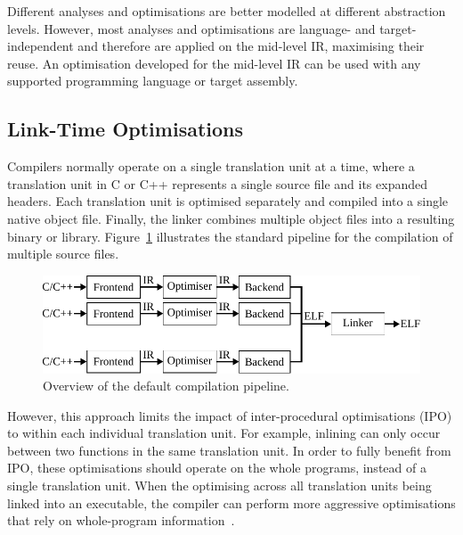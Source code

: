 Different analyses and optimisations are better modelled at different abstraction levels.
However, most analyses and optimisations are language- and target-independent and therefore are applied on the mid-level IR, maximising their reuse.
An optimisation developed for the mid-level IR can be used with any supported programming language or target assembly.

\subsection{Link-Time Optimisations}

Compilers normally operate on a single translation unit at a time, where a translation unit in C or C++ represents a single source file and its expanded headers.
Each translation unit is optimised separately and compiled into a single native object file.
Finally, the linker combines multiple object files into a resulting binary or library.
Figure~\ref{fig:full-pipeline} illustrates the standard pipeline for the compilation of multiple source files.

\begin{figure}[h]
  \centering
  \includegraphics[scale=0.85]{src/background/figs/full-pipeline.pdf}
  \caption{Overview of the default compilation pipeline.}
  \label{fig:full-pipeline}
\end{figure}

However, this approach limits the impact of inter-procedural optimisations (IPO) to within each individual translation unit.
For example, inlining can only occur between two functions in the same translation unit.
In order to fully benefit from IPO, these optimisations should operate on the whole programs, instead of a single translation unit.
When the optimising across all translation units being linked into an executable, the compiler can perform  more aggressive optimisations that rely on whole-program information~\cite{johnson17}.

